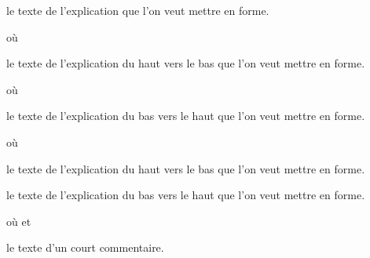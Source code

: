 \documentclass[12pt,a4paper]{article}
\begin{document}
\IDarg{} le texte de l'explication que l'on veut mettre en forme.


\separation


 où \quad {}

\IDarg{} le texte de l'explication du haut vers le bas que l'on veut mettre en forme.


\separation


 où \quad {}

\IDarg{} le texte de l'explication du bas vers le haut que l'on veut mettre en forme.


\separation


 où \quad {}

 le texte de l'explication du haut vers le bas que l'on veut mettre en forme.

 le texte de l'explication du bas vers le haut que l'on veut mettre en forme.


\separation


 où \quad {}
                            et 

\IDarg{} le texte d'un court commentaire.
\end{document}

